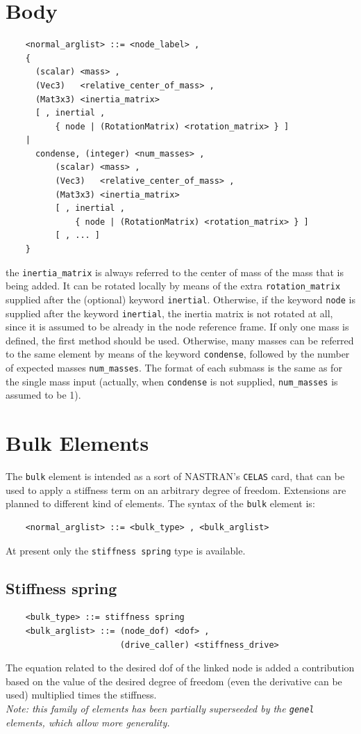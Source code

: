 \documentclass[10pt,dvips]{report}
\begin{document}
\section{Body}
\begin{verbatim}
    <normal_arglist> ::= <node_label> , 
    { 
      (scalar) <mass> , 
      (Vec3)   <relative_center_of_mass> ,
      (Mat3x3) <inertia_matrix>
      [ , inertial , 
          { node | (RotationMatrix) <rotation_matrix> } ]
    |
      condense, (integer) <num_masses> ,
          (scalar) <mass> , 
          (Vec3)   <relative_center_of_mass> ,
          (Mat3x3) <inertia_matrix> 
          [ , inertial , 
              { node | (RotationMatrix) <rotation_matrix> } ]
          [ , ... ]
    }
\end{verbatim}
the {\tt inertia\_matrix} is always referred to the center of mass of the
mass that is being added. It can be rotated locally by means of the extra
{\tt rotation\_matrix} supplied after the (optional) keyword {\tt inertial}.
Otherwise, if the keyword {\tt node} is supplied after the keyword 
{\tt inertial}, the inertia matrix is not rotated at all, since it is
assumed to be already in the node reference frame.
If only one mass is defined, the first method should be used. Otherwise,
many masses can be referred to the same element by means of the keyword
{\tt condense}, followed by the number of expected masses {\tt num\_masses}.
The format of each submass is the same as for the single mass input (actually, 
when {\tt condense} is not supplied, {\tt num\_masses} is assumed to be 1).




\section{Bulk Elements}
The {\tt bulk} element is intended as a sort of NASTRAN's {\tt CELAS} card,
that can be used to apply a stiffness term on an arbitrary degree of freedom.
Extensions are planned to different kind of elements.
The syntax of the {\tt bulk} element is:
\begin{verbatim}
    <normal_arglist> ::= <bulk_type> , <bulk_arglist>
\end{verbatim}
At present only the {\tt stiffness spring} type is available.

\subsection{Stiffness spring}
\begin{verbatim}
    <bulk_type> ::= stiffness spring
    <bulk_arglist> ::= (node_dof) <dof> ,
                       (drive_caller) <stiffness_drive>
\end{verbatim}
The equation related to the desired dof of the linked node is added a
contribution based on the value of the desired degree of freedom (even the
derivative can be used) multiplied times the stiffness. \\
{\em Note: this family of elements has been partially superseeded by the
{\tt genel} elements, which allow more generality.}
\end{document}
